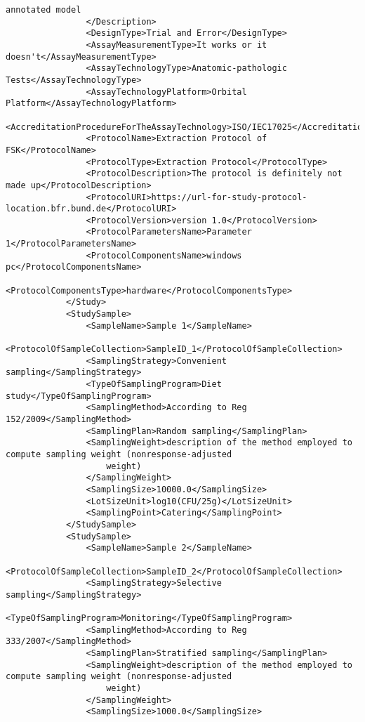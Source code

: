 \begin{lstlisting}[language=RAKIP, caption={Example of DoseResponseModel}]
                    annotated model
                </Description>
                <DesignType>Trial and Error</DesignType>
                <AssayMeasurementType>It works or it doesn't</AssayMeasurementType>
                <AssayTechnologyType>Anatomic-pathologic Tests</AssayTechnologyType>
                <AssayTechnologyPlatform>Orbital Platform</AssayTechnologyPlatform>
                <AccreditationProcedureForTheAssayTechnology>ISO/IEC17025</AccreditationProcedureForTheAssayTechnology>
                <ProtocolName>Extraction Protocol of FSK</ProtocolName>
                <ProtocolType>Extraction Protocol</ProtocolType>
                <ProtocolDescription>The protocol is definitely not made up</ProtocolDescription>
                <ProtocolURI>https://url-for-study-protocol-location.bfr.bund.de</ProtocolURI>
                <ProtocolVersion>version 1.0</ProtocolVersion>
                <ProtocolParametersName>Parameter 1</ProtocolParametersName>
                <ProtocolComponentsName>windows pc</ProtocolComponentsName>
                <ProtocolComponentsType>hardware</ProtocolComponentsType>
            </Study>
            <StudySample>
                <SampleName>Sample 1</SampleName>
                <ProtocolOfSampleCollection>SampleID_1</ProtocolOfSampleCollection>
                <SamplingStrategy>Convenient sampling</SamplingStrategy>
                <TypeOfSamplingProgram>Diet study</TypeOfSamplingProgram>
                <SamplingMethod>According to Reg 152/2009</SamplingMethod>
                <SamplingPlan>Random sampling</SamplingPlan>
                <SamplingWeight>description of the method employed to compute sampling weight (nonresponse-adjusted
                    weight)
                </SamplingWeight>
                <SamplingSize>10000.0</SamplingSize>
                <LotSizeUnit>log10(CFU/25g)</LotSizeUnit>
                <SamplingPoint>Catering</SamplingPoint>
            </StudySample>
            <StudySample>
                <SampleName>Sample 2</SampleName>
                <ProtocolOfSampleCollection>SampleID_2</ProtocolOfSampleCollection>
                <SamplingStrategy>Selective sampling</SamplingStrategy>
                <TypeOfSamplingProgram>Monitoring</TypeOfSamplingProgram>
                <SamplingMethod>According to Reg 333/2007</SamplingMethod>
                <SamplingPlan>Stratified sampling</SamplingPlan>
                <SamplingWeight>description of the method employed to compute sampling weight (nonresponse-adjusted
                    weight)
                </SamplingWeight>
                <SamplingSize>1000.0</SamplingSize>

\end{lstlisting}
